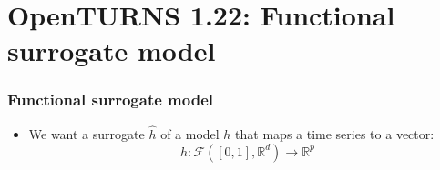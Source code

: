 \documentclass{beamer}
\begin{document}
\section{OpenTURNS 1.22: Functional surrogate model}
\usetikzlibrary {arrows.meta} %

\begin{frame}
  \frametitle{Functional surrogate model}
  
  \small
      \begin{itemize}
        \item We want a surrogate $\hat{h}$ of a model $h$ that maps a time series to a vector:
        \begin{equation*}
          h: \mathcal{F}([0, 1], \mathbb{R}^d) \rightarrow \mathbb{R}^p
        \end{equation*}
      \end{itemize}

\end{frame}
\end{document}
